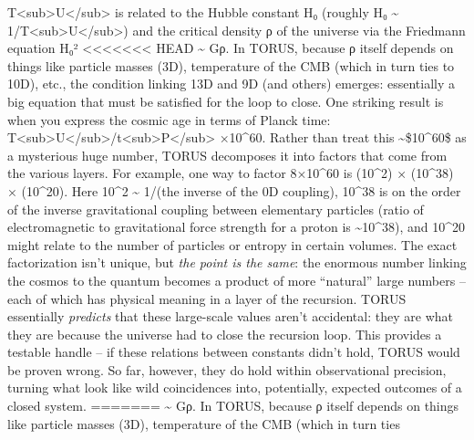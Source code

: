 \documentclass[]{article}
\begin{document}
\begin{itemize}
  T\textless{}sub\textgreater{}U\textless{}/sub\textgreater{} is related
  to the Hubble constant H₀ (roughly H₀ \textasciitilde{}
  1/T\textless{}sub\textgreater{}U\textless{}/sub\textgreater{}) and the
  critical density ρ of the universe via the Friedmann equation H₀²
<<<<<<< HEAD
  \textasciitilde{} Gρ\hspace{0pt}. In TORUS, because ρ itself depends
  on things like particle masses (3D), temperature of the CMB (which in
  turn ties to 10D), etc., the condition linking 13D and 9D (and others)
  emerges: essentially a big equation that must be satisfied for the
  loop to close. One striking result is when you express the cosmic age
  in terms of Planck time:
  T\textless sub\textgreater U\textless/sub\textgreater/t\textless sub\textgreater P\textless/sub\textgreater{}
  ×10\^{}60\hspace{0pt}. Rather than treat this
  \textasciitilde\$10\^{}60\$ as a mysterious huge number, TORUS
  decomposes it into factors that come from the various
  layers\hspace{0pt}. For example, one way to factor 8×10\^{}60 is
  (10\^{}2) × (10\^{}38) × (10\^{}20)\hspace{0pt}. Here 10\^{}2
  \textasciitilde{} 1/\alpha (the inverse of the 0D coupling), 10\^{}38 is on
  the order of the inverse gravitational coupling between elementary
  particles (ratio of electromagnetic to gravitational force strength
  for a proton is \textasciitilde10\^{}38), and 10\^{}20 might relate to
  the number of particles or entropy in certain volumes\hspace{0pt}. The
  exact factorization isn't unique, but \emph{the point is the same}:
  the enormous number linking the cosmos to the quantum becomes a
  product of more ``natural'' large numbers -- each of which has
  physical meaning in a layer of the recursion\hspace{0pt}. TORUS
  essentially \emph{predicts} that these large-scale values aren't
  accidental: they are what they are because the universe had to close
  the recursion loop. This provides a testable handle -- if these
  relations between constants didn't hold, TORUS would be proven
  wrong\hspace{0pt}. So far, however, they do hold within observational
  precision, turning what look like wild coincidences into, potentially,
  expected outcomes of a closed system.
=======
  \textasciitilde{} Gρ​. In TORUS, because ρ itself depends on things
  like particle masses (3D), temperature of the CMB (which in turn ties

\end{itemize}
\end{document}
